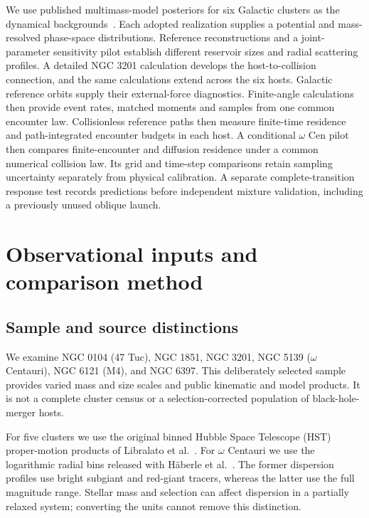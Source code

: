 \documentclass[aps,prd,reprint,amsmath,amssymb,superscriptaddress,nofootinbib,longbibliography,floatfix]{revtex4-2}
\begin{document}
We use published multimass-model posteriors for six Galactic clusters as the dynamical backgrounds~\cite{Gieles2015,Dickson2023,Dickson2024}. Each adopted realization supplies a potential and mass-resolved phase-space distributions. Reference reconstructions and a joint-parameter sensitivity pilot establish different reservoir sizes and radial scattering profiles. A detailed NGC 3201 calculation develops the host-to-collision connection, and the same calculations extend across the six hosts. Galactic reference orbits supply their external-force diagnostics. Finite-angle calculations then provide event rates, matched moments and samples from one common encounter law. Collisionless reference paths then measure finite-time residence and path-integrated encounter budgets in each host. A conditional $\omega$ Cen pilot then compares finite-encounter and diffusion residence under a common numerical collision law. Its grid and time-step comparisons retain sampling uncertainty separately from physical calibration. A separate complete-transition response test records predictions before independent mixture validation, including a previously unused oblique launch.

\section{Observational inputs and comparison method}\label{sec:data-method}

\subsection{Sample and source distinctions}

We examine NGC 0104 (47 Tuc), NGC 1851, NGC 3201, NGC 5139 ($\omega$ Centauri), NGC 6121 (M4), and NGC 6397. This deliberately selected sample provides varied mass and size scales and public kinematic and model products. It is not a complete cluster census or a selection-corrected population of black-hole-merger hosts.

For five clusters we use the original binned Hubble Space Telescope (HST) proper-motion products of Libralato et al.~\cite{Libralato2022}. For $\omega$ Centauri we use the logarithmic radial bins released with H\"aberle et al.~\cite{Haberle2025}. The former dispersion profiles use bright subgiant and red-giant tracers, whereas the latter use the full magnitude range. Stellar mass and selection can affect dispersion in a partially relaxed system; converting the units cannot remove this distinction.
\end{document}

